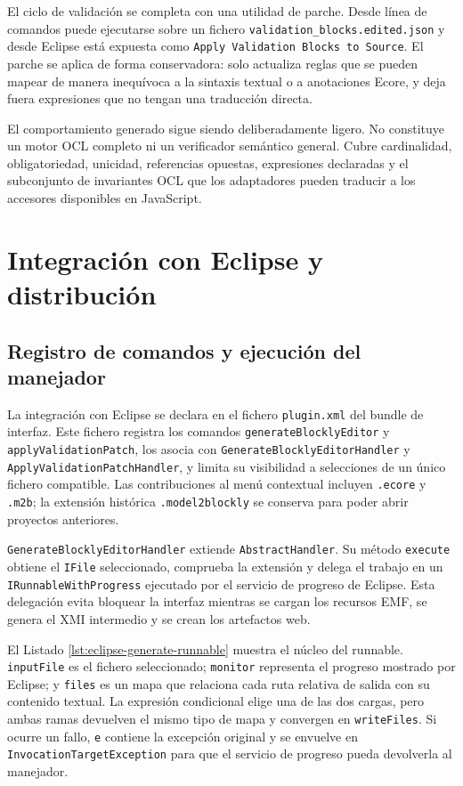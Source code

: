 El ciclo de validación se completa con una utilidad de parche. Desde línea de
comandos puede ejecutarse sobre un fichero
\texttt{validation\_blocks.edited.json} y desde Eclipse está expuesta como
\texttt{Apply Validation Blocks to Source}. El parche se aplica de forma
conservadora: solo actualiza reglas que se pueden mapear de manera inequívoca a
la sintaxis textual o a anotaciones Ecore, y deja fuera expresiones que no tengan
una traducción directa.

El comportamiento generado sigue siendo deliberadamente ligero. No constituye
un motor OCL completo ni un verificador semántico general. Cubre cardinalidad,
obligatoriedad, unicidad, referencias opuestas, expresiones declaradas y el
subconjunto de invariantes OCL que los adaptadores pueden traducir a los
accesores disponibles en JavaScript.

\section{Integración con Eclipse y distribución}
\label{sec:implementacion-eclipse-distribucion}

\subsection{Registro de comandos y ejecución del manejador}

La integración con Eclipse se declara en el fichero \texttt{plugin.xml} del
bundle de interfaz. Este fichero registra los comandos
\texttt{generateBlocklyEditor} y \texttt{applyValidationPatch}, los asocia con
\texttt{GenerateBlocklyEditorHandler} y
\texttt{ApplyValidationPatchHandler}, y limita su visibilidad a selecciones de
un único fichero compatible. Las contribuciones al menú contextual incluyen
\texttt{.ecore} y \texttt{.m2b}; la extensión histórica
\texttt{.model2blockly} se conserva para poder abrir proyectos anteriores.

\texttt{GenerateBlocklyEditorHandler} extiende \texttt{AbstractHandler}. Su
método \texttt{execute} obtiene el \texttt{IFile} seleccionado, comprueba la
extensión y delega el trabajo en un \texttt{IRunnableWithProgress} ejecutado
por el servicio de progreso de Eclipse. Esta delegación evita bloquear la
interfaz mientras se cargan los recursos EMF, se genera el XMI intermedio y se
crean los artefactos web.

El Listado \ref{lst:eclipse-generate-runnable} muestra el núcleo del runnable.
\texttt{inputFile} es el fichero seleccionado; \texttt{monitor} representa el
progreso mostrado por Eclipse; y \texttt{files} es un mapa que relaciona cada
ruta relativa de salida con su contenido textual. La expresión condicional
elige una de las dos cargas, pero ambas ramas devuelven el mismo tipo de mapa y
convergen en \texttt{writeFiles}. Si ocurre un fallo, \texttt{e} contiene la
excepción original y se envuelve en \texttt{InvocationTargetException} para que
el servicio de progreso pueda devolverla al manejador.

